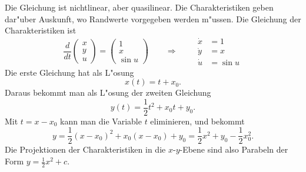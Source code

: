 \begin{loesung}
Die Gleichung ist nichtlinear, aber quasilinear.
Die Charakteristiken geben dar"uber Auskunft, wo Randwerte vorgegeben
werden m"ussen.
Die Gleichung der Charakteristiken ist 
\begin{equation}
\frac{d}{dt}\begin{pmatrix}x\\y\\u\end{pmatrix}
=
\begin{pmatrix}
1\\x\\\sin u
\end{pmatrix}
\qquad
\Rightarrow
\qquad
\begin{aligned}
\dot x &= 1\\
\dot y &= x\\
\dot u &=\sin u
\end{aligned}
\end{equation}
Die erste Gleichung hat als L"osung
\[
x(t) = t+x_0.
\]
Daraus bekommt man als L"osung der zweiten Gleichung
\[
y(t) = \frac12 t^2+x_0t+y_0.
\]
Mit $t=x-x_0$ kann man die Variable $t$ eliminieren, und
bekommt
\[
y=\frac12(x-x_0)^2+x_0(x-x_0)+y_0=\frac12x^2 + y_0-\frac12x_0^2.
\]
Die Projektionen der Charakteristiken in die $x$-$y$-Ebene sind also
Parabeln der Form $y=\frac12x^2+c$.


\end{loesung}
